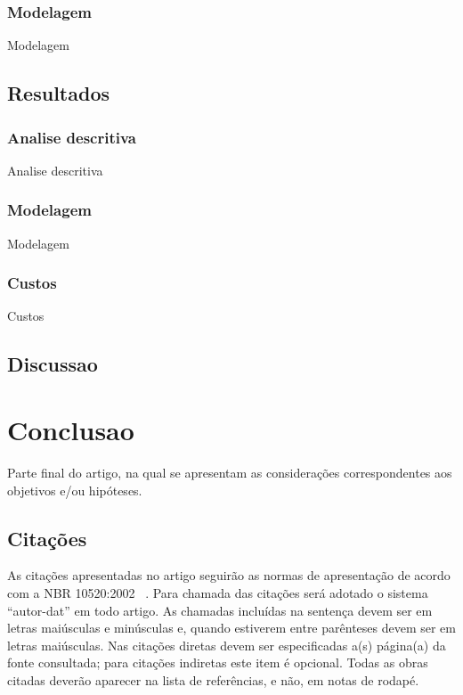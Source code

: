 \documentclass[article,a4paper,12pt,brazil,sumario=tradicional]{abntex2}
\begin{document}
\subsubsection{Modelagem}

Modelagem

\subsection{Resultados}

\subsubsection{Analise descritiva}

Analise descritiva

\subsubsection{Modelagem}

Modelagem

\subsubsection{Custos}

Custos

\subsection{Discussao}

\section{Conclusao}

Parte final do artigo, na qual se apresentam as considerações correspondentes aos objetivos e/ou hipóteses.

\subsection{Citações}

As citações apresentadas no artigo seguirão as normas de apresentação de acordo com a NBR 10520:2002 ~\cite{bibliografica6023}. Para chamada das citações será adotado o sistema ``autor-dat'' em todo artigo. As chamadas incluídas na sentença devem ser em letras maiúsculas e minúsculas e, quando estiverem entre parênteses devem ser em letras maiúsculas. Nas citações diretas devem ser especificadas a(s) página(a) da fonte consultada; para citações indiretas este item é opcional. Todas as obras citadas deverão aparecer na lista de referências, e não, em notas de rodapé.
\end{document}
